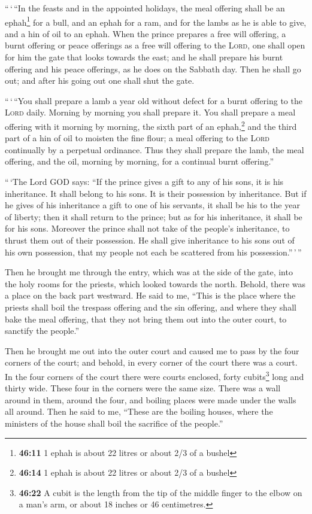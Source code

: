  ``\,`\,``In the feasts and in the appointed holidays,
the meal offering shall be an ephah\footnote{\textbf{46:11} 1 ephah is
  about 22 litres or about 2/3 of a bushel} for a bull, and an ephah for
a ram, and for the lambs as he is able to give, and a hin of oil to an
ephah.  When the prince prepares a free will offering, a
burnt offering or peace offerings as a free will offering to the
\textsc{Lord}, one shall open for him the gate that looks towards the
east; and he shall prepare his burnt offering and his peace offerings,
as he does on the Sabbath day. Then he shall go out; and after his going
out one shall shut the gate.

 ``\,`\,``You shall prepare a lamb a year old without
defect for a burnt offering to the \textsc{Lord} daily. Morning by
morning you shall prepare it.  You shall prepare a meal
offering with it morning by morning, the sixth part of an
ephah,\footnote{\textbf{46:14} 1 ephah is about 22 litres or about 2/3
  of a bushel} and the third part of a hin of oil to moisten the fine
flour; a meal offering to the \textsc{Lord} continually by a perpetual
ordinance.  Thus they shall prepare the lamb, the meal
offering, and the oil, morning by morning, for a continual burnt
offering.''

 ``\,`The Lord GOD says: ``If the prince gives a gift to
any of his sons, it is his inheritance. It shall belong to his sons. It
is their possession by inheritance.  But if he gives of
his inheritance a gift to one of his servants, it shall be his to the
year of liberty; then it shall return to the prince; but as for his
inheritance, it shall be for his sons.  Moreover the
prince shall not take of the people's inheritance, to thrust them out of
their possession. He shall give inheritance to his sons out of his own
possession, that my people not each be scattered from his
possession.''\,'\,''

 Then he brought me through the entry, which was at the
side of the gate, into the holy rooms for the priests, which looked
towards the north. Behold, there was a place on the back part westward.
 He said to me, ``This is the place where the priests
shall boil the trespass offering and the sin offering, and where they
shall bake the meal offering, that they not bring them out into the
outer court, to sanctify the people.''

 Then he brought me out into the outer court and caused
me to pass by the four corners of the court; and behold, in every corner
of the court there was a court.  In the four corners of
the court there were courts enclosed, forty cubits\footnote{\textbf{46:22}
  A cubit is the length from the tip of the middle finger to the elbow
  on a man's arm, or about 18 inches or 46 centimetres.} long and thirty
wide. These four in the corners were the same size. 
There was a wall around in them, around the four, and boiling places
were made under the walls all around.  Then he said to
me, ``These are the boiling houses, where the ministers of the house
shall boil the sacrifice of the people.''

